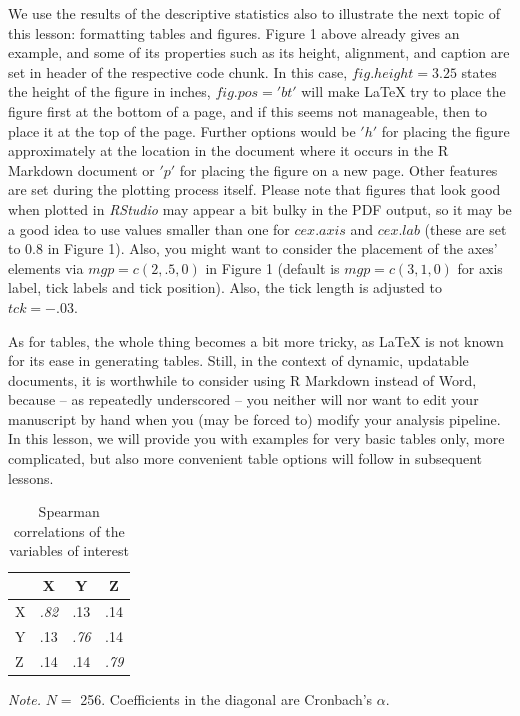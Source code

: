\documentclass[
]{article}
\begin{document}
We use the results of the descriptive statistics also to illustrate the
next topic of this lesson: formatting tables and figures. Figure 1 above
already gives an example, and some of its properties such as its height,
alignment, and caption are set in header of the respective code chunk.
In this case, \(fig.height=3.25\) states the height of the figure in
inches, \(fig.pos='bt'\) will make LaTeX try to place the figure first
at the bottom of a page, and if this seems not manageable, then to place
it at the top of the page. Further options would be \('h'\) for placing
the figure approximately at the location in the document where it occurs
in the R Markdown document or \('p'\) for placing the figure on a new
page. Other features are set during the plotting process itself. Please
note that figures that look good when plotted in \emph{RStudio} may
appear a bit bulky in the PDF output, so it may be a good idea to use
values smaller than one for \(cex.axis\) and \(cex.lab\) (these are set
to 0.8 in Figure 1). Also, you might want to consider the placement of
the axes' elements via \(mgp = c(2, .5, 0)\) in Figure 1 (default is
\(mgp = c(3, 1, 0)\) for axis label, tick labels and tick position).
Also, the tick length is adjusted to \(tck = -.03\).

As for tables, the whole thing becomes a bit more tricky, as LaTeX is
not known for its ease in generating tables. Still, in the context of
dynamic, updatable documents, it is worthwhile to consider using R
Markdown instead of Word, because -- as repeatedly underscored -- you
neither will nor want to edit your manuscript by hand when you (may be
forced to) modify your analysis pipeline. In this lesson, we will
provide you with examples for very basic tables only, more complicated,
but also more convenient table options will follow in subsequent
lessons.

\begin{table}[b!]
\begin{center}
\caption{Spearman correlations of the variables of interest}
\vspace{0.25cm}

\begin{tabular}{ l c c c }
  \hline
   & X & Y & Z \\ 
  \hline
   X & \textit{.82} & .13 & .14 \\
   Y & .13 & \textit{.76} & .14 \\
   Z & .14 & .14 & \textit{.79} \\
  \hline  
\end{tabular}
\vspace{0.25cm}

\textit{Note.} $N=$ 256. Coefficients in the diagonal are Cronbach's $\alpha$.
\end{center}
\end{table}
\end{document}
